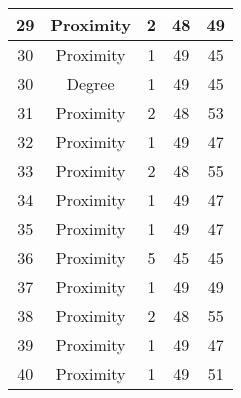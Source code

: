 \documentclass[results.tex]{subfiles}
\begin{document}
\begin{center}
\begin{tabular}{| c || c | c | c | c |}
            \hline
            29                      & Proximity                    & 2                      & 48                      & 49                   \\
            \hline
            30                      & Proximity                    & 1                      & 49                      & 45                   \\
            \hline
            30                      & Degree                       & 1                      & 49                      & 45                   \\
            \hline
            31                      & Proximity                    & 2                      & 48                      & 53                   \\
            \hline
            32                      & Proximity                    & 1                      & 49                      & 47                   \\
            \hline
            33                      & Proximity                    & 2                      & 48                      & 55                   \\
            \hline
            34                      & Proximity                    & 1                      & 49                      & 47                   \\
            \hline
            35                      & Proximity                    & 1                      & 49                      & 47                   \\
            \hline
            36                      & Proximity                    & 5                      & 45                      & 45                   \\
            \hline
            37                      & Proximity                    & 1                      & 49                      & 49                   \\
            \hline
            38                      & Proximity                    & 2                      & 48                      & 55                   \\
            \hline
            39                      & Proximity                    & 1                      & 49                      & 47                   \\
            \hline
            40                      & Proximity                    & 1                      & 49                      & 51                   \\

\end{tabular}
\end{center}
\end{document}
